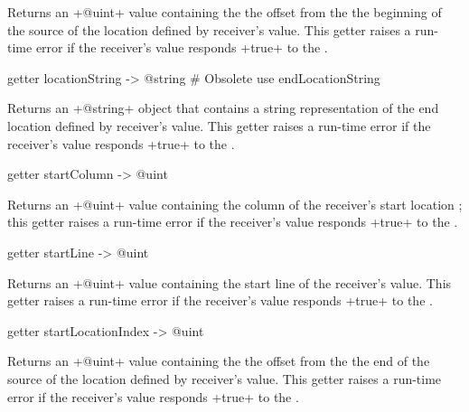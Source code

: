 Returns an \ggst+@uint+ value containing the the offset from the the beginning of the source of the location defined by receiver's value. This getter raises a run-time error if the receiver's value responds \ggst+true+ to the .




\begin{galgas3}
getter locationString -> @string # Obsolete use endLocationString
\end{galgas3}

Returns an \ggst+@string+ object that contains a string representation of the end location defined by receiver's value. This getter raises a run-time error if the receiver's value responds \ggst+true+ to the .




\begin{galgas3}
getter startColumn -> @uint
\end{galgas3}

Returns an \ggst+@uint+ value containing the column of the receiver's start location ; this getter raises a run-time error if the receiver's value responds \ggst+true+ to the .



\begin{galgas3}
getter startLine -> @uint
\end{galgas3}

Returns an \ggst+@uint+ value containing the start line of the receiver's value. This getter raises a run-time error if the receiver's value responds \ggst+true+ to the .




\begin{galgas3}
getter startLocationIndex -> @uint
\end{galgas3}

Returns an \ggst+@uint+ value containing the the offset from the the end of the source of the location defined by receiver's value. This getter raises a run-time error if the receiver's value responds \ggst+true+ to the .


